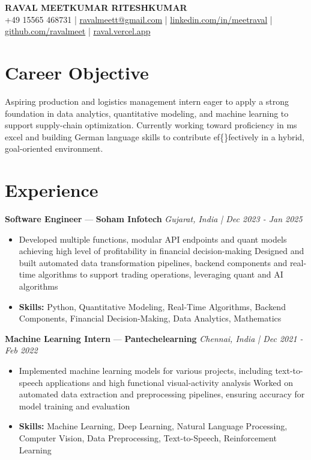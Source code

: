 \documentclass[a4paper,10pt]{article}
\begin{document}
\begin{center}
  {\Large\bfseries RAVAL MEETKUMAR RITESHKUMAR}\\[2pt]
  {\small +49 15565 468731 \;|\; \href{mailto:ravalmeett@gmail.com}{ravalmeett@gmail.com} \;|\; \href{https://www.linkedin.com/in/meetraval/}{linkedin.com/in/meetraval} \;|\; \href{https://github.com/ravalmeet}{github.com/ravalmeet} \;|\; \href{https://raval.vercel.app/}{raval.vercel.app}}
\end{center}
\vspace{-3pt}

\section*{Career Objective}
Aspiring production and logistics management intern eager to apply a strong foundation in data analytics, quantitative modeling, and machine learning to support supply-chain optimization. Currently working toward proficiency in ms excel and building German language skills to contribute ef\{\}fectively in a hybrid, goal-oriented environment.\par

\section*{Experience}
\textbf{Software Engineer} — \textbf{Soham Infotech} \hfill \textit{Gujarat, India \;|\; Dec 2023 - Jan 2025}\par
\vspace{1pt}
\begin{itemize}
  \item Developed multiple functions, modular API endpoints and quant models achieving high level of profitability in financial decision-making Designed and built automated data transformation pipelines, backend components and real-time algorithms to support trading operations, leveraging quant and AI algorithms
  \item \textbf{Skills:} Python, Quantitative Modeling, Real-Time Algorithms, Backend Components, Financial Decision-Making, Data Analytics, Mathematics
\end{itemize}
\vspace{3pt}
\textbf{Machine Learning Intern} — \textbf{Pantechelearning} \hfill \textit{Chennai, India \;|\; Dec 2021 - Feb 2022}\par
\vspace{1pt}
\begin{itemize}
  \item Implemented machine learning models for various projects, including text-to-speech applications and high functional visual-activity analysis Worked on automated data extraction and preprocessing pipelines, ensuring accuracy for model training and evaluation
  \item \textbf{Skills:} Machine Learning, Deep Learning, Natural Language Processing, Computer Vision, Data Preprocessing, Text-to-Speech, Reinforcement Learning
\end{itemize}
\end{document}
